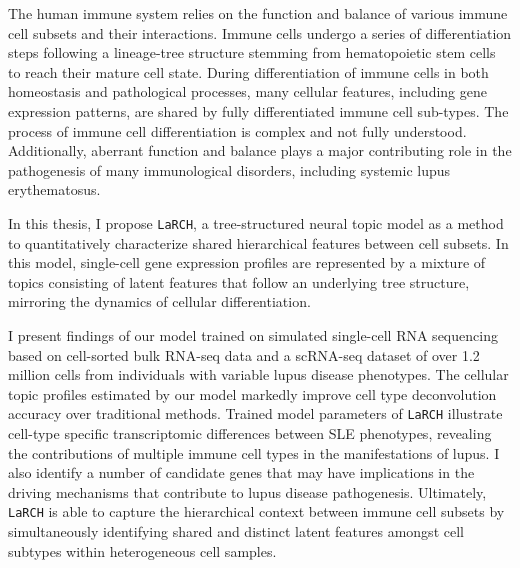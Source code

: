 The human immune system relies on the function and balance of various immune cell subsets and their interactions. Immune cells undergo a series of differentiation steps following a lineage-tree structure stemming from hematopoietic stem cells to reach their mature cell state. During differentiation of immune cells in both homeostasis and pathological processes, many cellular features, including gene expression patterns, are shared by fully differentiated immune cell sub-types. The process of immune cell differentiation is complex and not fully understood. Additionally, aberrant function and balance plays a major contributing role in the pathogenesis of many immunological disorders, including systemic lupus erythematosus.

In this thesis, I propose \texttt{LaRCH}, a tree-structured neural topic model as a method to quantitatively characterize shared hierarchical features between cell subsets. In this model, single-cell gene expression profiles are represented by a mixture of topics consisting of latent features that follow an underlying tree structure, mirroring the dynamics of cellular differentiation. 

I present findings of our model trained on simulated single-cell RNA sequencing based on cell-sorted bulk RNA-seq data and a scRNA-seq dataset of over 1.2 million cells from individuals with variable lupus disease phenotypes. The cellular topic profiles estimated by our model markedly improve cell type deconvolution accuracy over traditional methods. Trained model parameters of \texttt{LaRCH} illustrate cell-type specific transcriptomic differences between SLE phenotypes, revealing the contributions of multiple immune cell types in the manifestations of lupus. I also identify a number of candidate genes that may have implications in the driving mechanisms that contribute to lupus disease pathogenesis. Ultimately, \texttt{LaRCH} is able to capture the hierarchical context between immune cell subsets by simultaneously identifying shared and distinct latent features amongst cell subtypes within heterogeneous cell samples.
